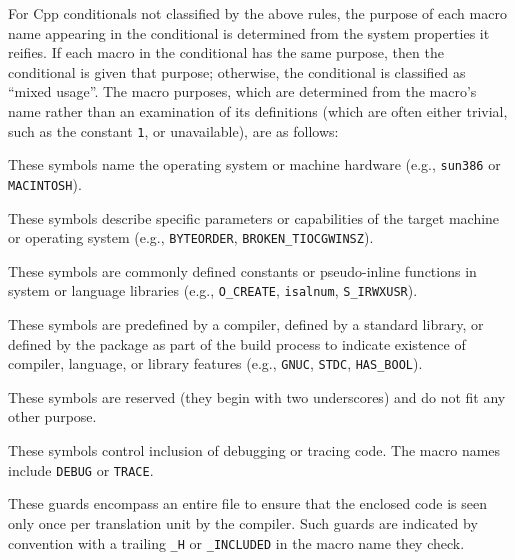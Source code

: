 \documentclass[10pt]{article}
\begin{document}
For Cpp conditionals not classified by the above rules, the purpose of each
macro name appearing in the conditional is determined from the system
properties it reifies.  If each macro in the conditional has the same
purpose, then the conditional is given that purpose; otherwise, the
conditional is classified as ``mixed usage''.  The macro purposes, which
are determined from the macro's name rather than an examination of its
definitions (which are often either trivial, such as the constant {\tt 1},
or unavailable), are as follows:

\begin{description}\itemsep 0pt \parskip 0pt

\item[Portability, machine]
  These symbols name the operating system or machine
  hardware (e.g., \texttt{sun386} or \texttt{MACINTOSH}).
      
\item[Portability, feature] These symbols describe specific parameters
      or capabilities of the target machine or operating system (e.g.,
      \texttt{BYTEORDER}, \verb|BROKEN_TIOCGWINSZ|).  
      

\item[Portability, system]
  These symbols are commonly defined constants or
  pseudo-inline functions in system or language libraries (e.g.,
  \verb|O_CREATE|, \texttt{isalnum}, \verb|S_IRWXUSR|).

\item[Portability, language or library]
  These symbols are predefined by a compiler, defined by a standard
  library, or defined by the package as part of the build
  process to indicate existence of compiler, language, or library features
  (e.g., \texttt{GNUC}, \texttt{STDC}, \verb|HAS_BOOL|).

\item[Miscellaneous system]
  These symbols are reserved (they begin with two underscores) and do
  not fit any other purpose.
      
\item[Debugging]
  These symbols control inclusion of debugging or tracing code.  The macro
  names include \texttt{DEBUG} or \texttt{TRACE}.
      
\item[Multiple inclusion prevention]
  These guards encompass an entire file to ensure that the enclosed code is
  seen only once per translation unit by the compiler.  Such guards are
  indicated by convention with a trailing \verb|_H| or \verb|_INCLUDED| in the macro name
  they check.


\end{description}
\end{document}
